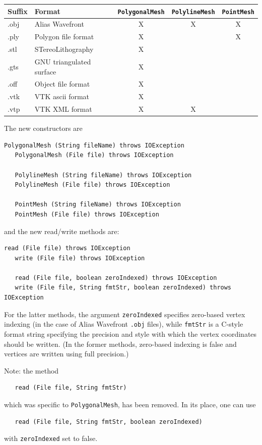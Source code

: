 \documentclass{article}
\begin{document}
\begin{center}
\begin{tabular}{|ll|ccc|}
\hline
Suffix & Format & {\tt PolygonalMesh} & {\tt PolylineMesh} & {\tt PointMesh} \\
\hline
.obj & Alias Wavefront &X&X&X\\
.ply & Polygon file format &X&&X\\
.stl & STereoLithography &X&&\\
.gts & GNU triangulated surface &X&&\\
.off & Object file format &X&&\\
.vtk & VTK ascii format &X&&\\
.vtp & VTK XML format &X&X&\\
\hline
\end{tabular}
\end{center}

The new constructors are
%
\begin{lstlisting}[]
   PolygonalMesh (String fileName) throws IOException
   PolygonalMesh (File file) throws IOException

   PolylineMesh (String fileName) throws IOException
   PolylineMesh (File file) throws IOException

   PointMesh (String fileName) throws IOException
   PointMesh (File file) throws IOException
\end{lstlisting}
%
and the new read/write methods are:
\begin{lstlisting}[]
   read (File file) throws IOException
   write (File file) throws IOException

   read (File file, boolean zeroIndexed) throws IOException
   write (File file, String fmtStr, boolean zeroIndexed) throws IOException
\end{lstlisting}
%
For the latter methods, the argument {\tt zeroIndexed} specifies
zero-based vertex indexing (in the case of Alias Wavefront {\tt .obj}
files), while {\tt fmtStr} is a C-style format string specifying the
precision and style with which the vertex coordinates should be
written. (In the former methods, zero-based indexing is false and
vertices are written using full precision.)

\begin{sideblock}
Note: the method
\begin{verbatim}
   read (File file, String fmtStr)
\end{verbatim}
which was specific to {\tt PolygonalMesh}, has been removed.
In its place, one can use
\begin{verbatim}
   read (File file, String fmtStr, boolean zeroIndexed)
\end{verbatim}
with {\tt zeroIndexed} set to false.
\end{sideblock}
\end{document}

